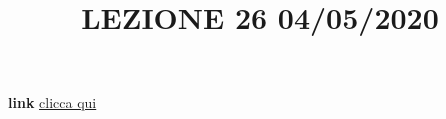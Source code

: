 \newline
\newline
\title{LEZIONE 26 04/05/2020}\newline
\textbf{link} \href{https://web.microsoftstream.com/video/e0e52ee4-ef7f-47fa-8f03-7d84cd6422f7?list=user&userId=faa91214-a6f5-40d7-8875-253fd49b8ce1}{clicca qui}